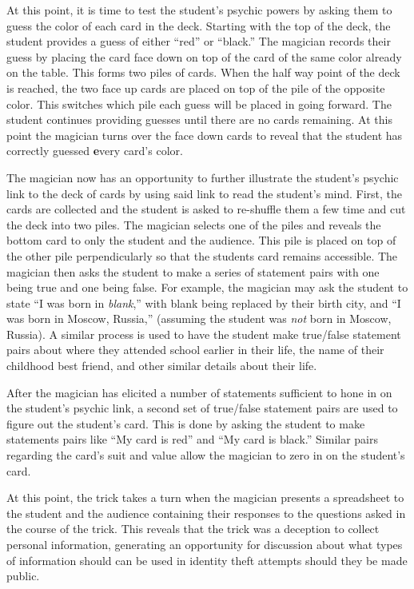 At this point, it is time to test the student's psychic powers by asking them to
guess the color of each card in the deck.  Starting with the top of the deck,
the student provides a guess of either ``red'' or ``black.''  The magician
records their guess by placing the card face down on top of the card of the same
color already on the table.  This forms two piles of cards.  When the half way
point of the deck is reached, the two face up cards are placed on top of the
pile of the opposite color.  This switches which pile each guess
will be placed in going forward.  The student continues providing guesses until
there are no cards remaining.  At this point the magician turns over the face
down cards to reveal that the student has correctly guessed {\textbf every}
card's color.

The magician now has an opportunity to further illustrate the student's psychic
link to the deck of cards by using said link to read the student's mind.
First, the cards are collected and the student is asked to
re-shuffle them a few time and cut the deck into two piles.  The magician
selects one of the piles and reveals the bottom card to only the student and the
audience.  This pile is placed on top of the other pile perpendicularly so that
the students card remains accessible.  The magician then asks the student to
make a series of statement pairs with one being true and one being false.  For
example,  the magician may ask the student to state  ``I was born in
\textit{blank},'' with blank being replaced by their birth city, and ``I was
born in Moscow, Russia,'' (assuming the student was \textit{not} born in Moscow,
Russia).  A similar process is used to have the student make true/false
statement pairs about where they attended school earlier in their life, the name
of their childhood best friend, and other similar details about their life.

After the magician has elicited a number of statements sufficient to hone in on
the student's psychic link, a second set of true/false statement pairs are used
to figure out the student's card.  This is done by asking the student to make
statements pairs like ``My card is red'' and ``My card is black.''  Similar
pairs regarding the card's suit and value allow the magician to zero
in on the student's card.

At this point, the trick takes a turn when the magician presents a spreadsheet
to the student and the audience containing their responses to the questions
asked in the course of the trick. This reveals that the trick
was a deception to
collect personal information, generating an opportunity for discussion about what
types of information should can be used in identity theft attempts should they
be made public.


